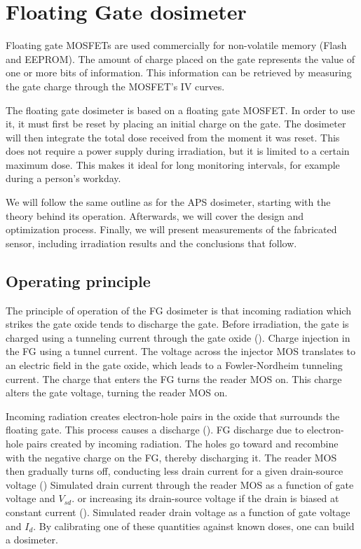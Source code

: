 \section{Floating Gate dosimeter}
Floating gate MOSFETs are used commercially for non-volatile memory (Flash and EEPROM).
The amount of charge placed on the gate represents the value of one or more bits of information.
This information can be retrieved by measuring the gate charge through the MOSFET's IV curves.

The floating gate dosimeter is based on a floating gate MOSFET.
In order to use it, it must first be reset by placing an initial charge on the gate.
The dosimeter will then integrate the total dose received from the moment it was reset.
This does not require a power supply during irradiation, but it is limited to a certain maximum dose.
This makes it ideal for long monitoring intervals,
for example during a person's workday.

We will follow the same outline as for the APS dosimeter,
starting with the theory behind its operation.
Afterwards, we will cover the design and optimization process.
Finally, we will present measurements of the fabricated sensor,
including irradiation results and the conclusions that follow.
%
\subsection{Operating principle}
The principle of operation of the FG dosimeter is that
incoming radiation which strikes the gate oxide
tends to discharge the gate.
Before irradiation,
the gate is charged using a tunneling current through the gate oxide
().
{ Charge injection in the FG using a tunnel current.
The voltage across the injector MOS translates to an electric field in the gate oxide,
which leads to a Fowler-Nordheim tunneling current.
The charge that enters the FG turns the reader MOS on.}
This charge alters the gate voltage, turning the reader MOS on.

Incoming radiation creates electron-hole pairs in the oxide that surrounds the floating gate.
This process causes a discharge
().
{ FG discharge due to electron-hole pairs created by incoming radiation.
The holes go toward and recombine with the negative charge on the FG, thereby discharging it.}
The reader MOS then gradually turns off,
conducting less drain current for a given drain-source voltage
()
{ Simulated drain current through the reader MOS as a function of gate voltage and $V_{sd}$.}
or increasing its drain-source voltage if the drain is biased at constant current
().
{ Simulated reader drain voltage as a function of gate voltage and $I_d$.}
By calibrating one of these quantities against known doses,
one can build a dosimeter.
%
